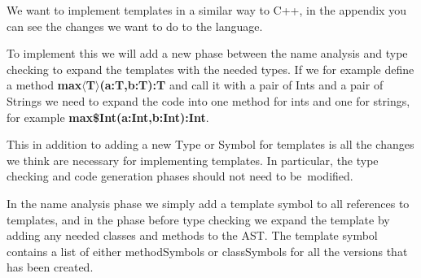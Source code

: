 We want to implement templates in a similar way to C++, in the appendix you can
see the changes we want to do to the language.

To implement this we will add a new phase between the name analysis and type
checking to expand the templates with the needed types. If we for example define
a method \textbf{max$\langle$T$\rangle$(a:T,b:T):T} and call it with a pair of
Ints and a pair of Strings we need to expand the code into one method for ints
and one for strings, for example \textbf{max\$Int(a:Int,b:Int):Int}.

This in addition to adding a new Type or Symbol for templates is all the changes
we think are necessary for implementing templates. In particular, the type
checking and code generation phases should not need to be~modified.

In the name analysis phase we simply add a template symbol to all references to
templates, and in the phase before type checking we expand the template by adding
any needed classes and methods to the AST. The template symbol contains a list of
either methodSymbols or classSymbols for all the versions that has been created.

\iffalse
The first thing our compiled does is checking whether the code compiles to
the BNF, this is done in two steps by first tokenizing the code into the
tokens found in our language, and then in the parser check whether the order
of the tokens are in complient with our language. We had to add some rules to
the BNF to make room for templates, the addition can be found in the appendix.
In the next part, name analysis we make sure that the code follows a set of rules
and attatch symbols to all identifiers. After the name analysis we run type
checking where we detect and make sure that all expressions produce the correct
type. To make this part work with templates we have to expand all templates
befor we run the type checking, and modify the symbols slighetly.
\fi
